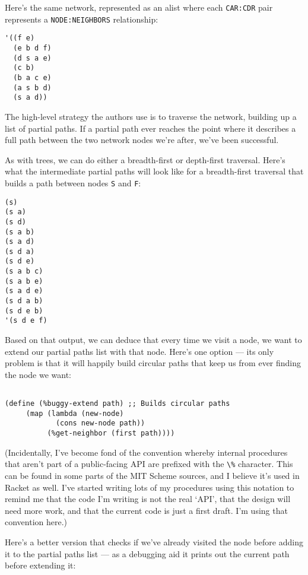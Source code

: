 \documentclass[12pt,openright,draft]{book}
\begin{document}
Here's the same network, represented as an alist where each
\verb|CAR:CDR| pair represents a \verb|NODE:NEIGHBORS| relationship:

\begin{verbatim}
'((f e)
  (e b d f)
  (d s a e)
  (c b)
  (b a c e)
  (a s b d)
  (s a d))
\end{verbatim}

The high-level strategy the authors use is to traverse the network,
building up a list of partial paths.  If a partial path ever reaches
the point where it describes a full path between the two network nodes
we're after, we've been successful.

As with trees, we can do either a breadth-first or depth-first
traversal.  Here's what the intermediate partial paths will look like
for a breadth-first traversal that builds a path between nodes
\verb|S| and \verb|F|:

\begin{verbatim}
(s)
(s a)
(s d)
(s a b)
(s a d)
(s d a)
(s d e)
(s a b c)
(s a b e)
(s a d e)
(s d a b)
(s d e b)
'(s d e f)
\end{verbatim}

Based on that output, we can deduce that every time we visit a node,
we want to extend our partial paths list with that node.  Here's one
option --- its only problem is that it will happily build circular
paths that keep us from ever finding the node we want:

\begin{verbatim}

(define (%buggy-extend path) ;; Builds circular paths
     (map (lambda (new-node)
            (cons new-node path))
          (%get-neighbor (first path))))

\end{verbatim}

(Incidentally, I've become fond of the convention whereby internal
procedures that aren't part of a public-facing API are prefixed with
the \verb|\%| character.  This can be found in some parts of the MIT
Scheme sources, and I believe it's used in Racket as well.  I've
started writing lots of my procedures using this notation to remind me
that the code I'm writing is not the real `API', that the design will
need more work, and that the current code is just a first draft.  I'm
using that convention here.)

Here's a better version that checks if we've already visited the node
before adding it to the partial paths list --- as a debugging aid it
prints out the current path before extending it:
\end{document}
